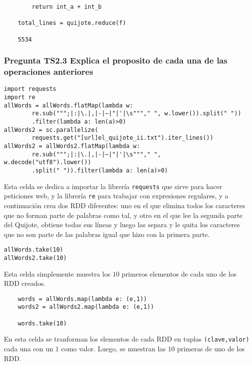 \documentclass[11pt]{article}
\def\inline{\lstinline[basicstyle=\ttfamily,keywordstyle={}]}
\begin{document}
{{\begin{itemize}
\begin{verbatim}
        return int_a + int_b
      
    total_lines = quijote.reduce(f)

    5534
    \end{verbatim}

\end{itemize}

\subsubsection*{ Pregunta TS2.3 Explica el proposito de cada una de las operaciones anteriores}

\begin{verbatim}
import requests
import re
allWords = allWords.flatMap(lambda w: 
        re.sub(""";|:|\.|,|-|–|"|'|\s"""," ", w.lower()).split(" "))
        .filter(lambda a: len(a)>0)
allWords2 = sc.parallelize(
        requests.get("[url]el_quijote_ii.txt").iter_lines())
allWords2 = allWords2.flatMap(lambda w: 
        re.sub(""";|:|\.|,|-|–|"|'|\s"""," ", w.decode("utf8").lower())
        .split(" ")).filter(lambda a: len(a)>0)
\end{verbatim}

Esta celda se dedica a importar la librería \inline{requests} que sirve para hacer peticiones web, y la librería \inline{re} para trabajar con expresiones regulares, y a continuación crea dos RDD diferentes: uno en el que elimina todos los caracteres que no forman parte de palabras como tal, y otro en el que lee la segunda parte del Quijote, obtiene todas sus líneas y luego las separa y le quita los caracteres que no son parte de las palabras igual que hizo con la primera parte.

\begin{verbatim}
allWords.take(10)
allWords2.take(10)
\end{verbatim}

Esta celda simplemente muestra los $10$ primeros elementos de cada uno de los RDD creados.


\begin{verbatim}
    words = allWords.map(lambda e: (e,1))
    words2 = allWords2.map(lambda e: (e,1))
    
    words.take(10)
\end{verbatim}

En esta celda se tranforman los elementos de cada RDD en tuplas \inline{(clave,valor)} cada una con un $1$ como valor. Luego, se muestran las $10$ primeras de uno de los RDD.

}}
\end{document}
